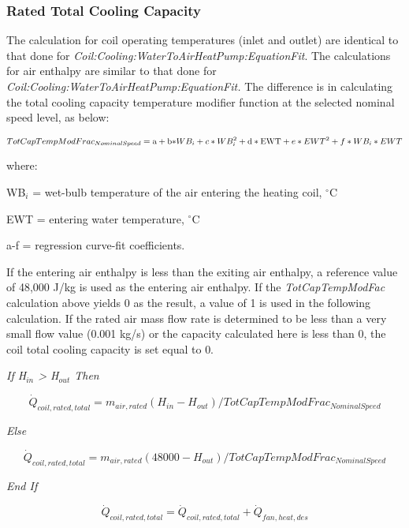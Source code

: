 \subsubsection{Rated Total Cooling Capacity}\label{rated-total-cooling-capacity-1}

The calculation for coil operating temperatures (inlet and outlet) are identical to that done for \emph{Coil:Cooling:WaterToAirHeatPump:EquationFit}. The calculations for air enthalpy are similar to that done for \emph{Coil:Cooling:WaterToAirHeatPump:EquationFit.} The difference is in calculating the total cooling capacity temperature modifier function at the selected nominal speed level, as below:

\begin{equation}
TotCapTempModFra{c_{NominalSpeed}} = {\rm{a}} + {\rm{b*}}W{B_i} + c*WB_i^2 + {\rm{d*EWT}} + e*EW{T^2} + f*W{B_i}*EWT
\end{equation}

where:

WB\(_{i}\) = wet-bulb temperature of the air entering the heating coil, \(^{\circ}\)C

EWT = entering water temperature, \(^{\circ}\)C

a-f = regression curve-fit coefficients.

If the entering air enthalpy is less than the exiting air enthalpy, a reference value of 48,000 J/kg is used as the entering air enthalpy. If the \emph{TotCapTempModFac} calculation above yields 0 as the result, a value of 1 is used in the following calculation. If the rated air mass flow rate is determined to be less than a very small flow value (0.001 kg/s) or the capacity calculated here is less than 0, the coil total cooling capacity is set equal to 0.

\emph{If H\(_{in}\) \textgreater{} H\(_{out}\) Then}

\begin{equation}
{\dot {Q}_{coil,rated,total}} = {m_{air,rated}}({H_{in}} - {H_{out}})/TotCapTempModFra{c_{NominalSpeed}}
\end{equation}

\emph{Else}

\begin{equation}
{\dot {Q}_{coil,rated,total}} = {m_{air,rated}}(48000 - {H_{out}})/TotCapTempModFra{c_{NominalSpeed}}
\end{equation}

\emph{End If}

\begin{equation}
{\dot{Q}_{coil,rated,total}} = {\dot{Q}_{coil,rated,total}} + \dot{Q}_{fan,heat,des}
\end{equation}

